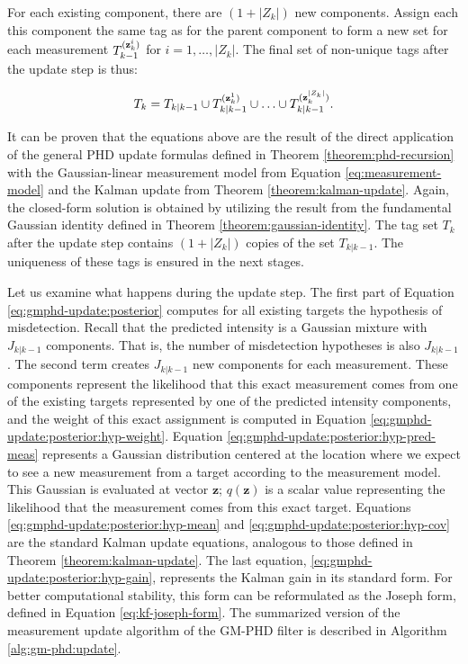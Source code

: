 \begin{theorem}
    \noindent For each existing component, there are $(1 + |Z_k|)$ new components. Assign each this component the same tag as for the parent component to form a new set for each measurement $T_{k-1}^{(\svecat{z}{k}{i})}$ for $i = 1, \ldots, |Z_k|$. The final set of non-unique tags after the update step is thus:

    \begin{equation}
        T_k = T_{k|k-1} \cup T_{k|k-1}^{(\svecat{z}{k}{1})} \cup \ldots \cup T_{k|k-1}^{(\svecat{z}{k}{|Z_k|})}.
    \end{equation}
\end{theorem}

It can be proven that the equations above are the result of the direct application of the general PHD update formulas defined in Theorem \ref{theorem:phd-recursion} with the Gaussian-linear measurement model from Equation \ref{eq:measurement-model} and the Kalman update from Theorem \ref{theorem:kalman-update}. Again, the closed-form solution is obtained by utilizing the result from the fundamental Gaussian identity defined in Theorem \ref{theorem:gaussian-identity}. The tag set $T_k$ after the update step contains $(1 + |Z_k|)$ copies of the set $T_{k|k-1}$. The uniqueness of these tags is ensured in the next stages.

Let us examine what happens during the update step. The first part of Equation \ref{eq:gmphd-update:posterior} computes for all existing targets the hypothesis of misdetection. Recall that the predicted intensity is a Gaussian mixture with $J_{k|k-1}$ components. That is, the number of misdetection hypotheses is also $J_{k|k-1}$. The second term creates $J_{k|k-1}$ new components for each measurement. These components represent the likelihood that this exact measurement comes from one of the existing targets represented by one of the predicted intensity components, and the weight of this exact assignment is computed in Equation \ref{eq:gmphd-update:posterior:hyp-weight}. Equation \ref{eq:gmphd-update:posterior:hyp-pred-meas} represents a Gaussian distribution centered at the location where we expect to see a new measurement from a target according to the measurement model. This Gaussian is evaluated at vector $\mathbf{z}$; $q(\mathbf{z})$ is a scalar value representing the likelihood that the measurement comes from this exact target. Equations \ref{eq:gmphd-update:posterior:hyp-mean} and \ref{eq:gmphd-update:posterior:hyp-cov} are the standard Kalman update equations, analogous to those defined in Theorem \ref{theorem:kalman-update}. The last equation, \ref{eq:gmphd-update:posterior:hyp-gain}, represents the Kalman gain in its standard form. For better computational stability, this form can be reformulated as the Joseph form, defined in Equation \ref{eq:kf-joseph-form}. The summarized version of the measurement update algorithm of the GM-PHD filter is described in Algorithm \ref{alg:gm-phd:update}.

